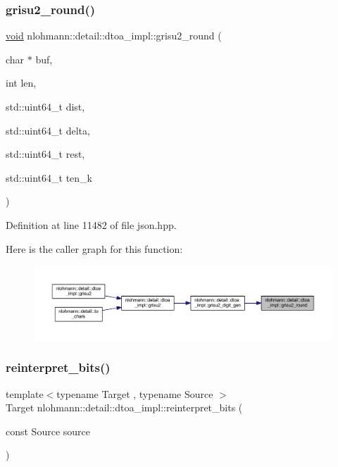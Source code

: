 \subsubsection{\texorpdfstring{grisu2\_round()}{grisu2\_round()}}
{\footnotesize\ttfamily \mbox{\hyperlink{namespacenlohmann_1_1detail_a59fca69799f6b9e366710cb9043aa77d}{void}} nlohmann\+::detail\+::dtoa\+\_\+impl\+::grisu2\+\_\+round (\begin{DoxyParamCaption}\item[{char $\ast$}]{buf,  }\item[{int}]{len,  }\item[{std\+::uint64\+\_\+t}]{dist,  }\item[{std\+::uint64\+\_\+t}]{delta,  }\item[{std\+::uint64\+\_\+t}]{rest,  }\item[{std\+::uint64\+\_\+t}]{ten\+\_\+k }\end{DoxyParamCaption})\hspace{0.3cm}{\ttfamily [inline]}}



Definition at line 11482 of file json.\+hpp.

Here is the caller graph for this function\+:
\nopagebreak
\begin{figure}[H]
\begin{center}
\leavevmode
\includegraphics[width=350pt]{namespacenlohmann_1_1detail_1_1dtoa__impl_a5bc841e0bee12fd6489d49cf7bd07bb4_icgraph}
\end{center}
\end{figure}
\mbox{\label{namespacenlohmann_1_1detail_1_1dtoa__impl_a1c5d30eb51e5e994a3f48bde104d2ce8}} 
\subsubsection{\texorpdfstring{reinterpret\_bits()}{reinterpret\_bits()}}
{\footnotesize\ttfamily template$<$typename Target , typename Source $>$ \\
Target nlohmann\+::detail\+::dtoa\+\_\+impl\+::reinterpret\+\_\+bits (\begin{DoxyParamCaption}\item[{const Source}]{source }\end{DoxyParamCaption})}




